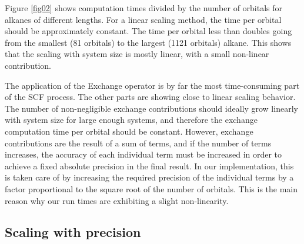 \documentclass[journal=jctcce, manuscript=article]{achemso}
\begin{document}
Figure \ref{fig02} shows computation times divided by the number of orbitals for alkanes of different lengths. For a linear scaling method, the time per orbital should be approximately constant.  The time per orbital less than doubles going from the smallest (81 orbitals) to the largest (1121 orbitals) alkane. This shows that the scaling with system size is mostly linear, with a small non-linear contribution.  



The application of the Exchange operator is by far the most time-consuming part of the \ac{SCF} process. The other parts are showing close to linear scaling behavior.
The number of non-negligible exchange contributions should ideally grow linearly with system size for large enough systems, and therefore the exchange computation time per orbital should be constant. However, exchange contributions are the result of a sum of terms, and if the number of terms increases, the accuracy of each individual term must be increased in order to achieve a fixed absolute precision in the final result. In our implementation, this is taken care of by increasing the required precision of the individual terms by a factor proportional to the square root of the number of orbitals. This is the main reason why our run times are exhibiting a slight non-linearity.





\subsection{Scaling with precision}
 
\end{document}

